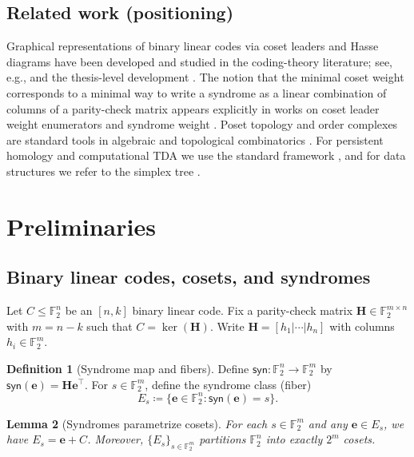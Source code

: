 \documentclass[11pt,twoside,leqno]{article}
\theoremstyle{definition}
\newtheorem{definition}{Definition}[section]
\theoremstyle{plain}
\newtheorem{lemma}[definition]{Lemma}
\theoremstyle{remark}
\newcommand{\Ftwo}{\mathbb{F}_2}
\newcommand{\syn}{\mathsf{syn}}
\newcommand{\HH}{\mathbf{H}}
\newcommand{\ee}{\mathbf{e}}
\begin{document}
\subsection{Related work (positioning)}\label{sec:related}
Graphical representations of binary linear codes via coset leaders and Hasse diagrams have been developed and studied in the coding-theory
literature; see, e.g., \cite{DelgadoCastilloHolguin2022} and the thesis-level development \cite{DelgadoThesis2021}. The notion that the minimal
coset weight corresponds to a minimal way to write a syndrome as a linear combination of columns of a parity-check matrix appears explicitly in
works on coset leader weight enumerators and syndrome weight \cite{Blokhuis2022,PellikaanSlides}. Poset topology and order complexes are standard
tools in algebraic and topological combinatorics \cite{BjornerTopMeth,WachsPosetTopology}. For persistent homology and computational TDA we use the
standard framework \cite{EdelsbrunnerHarer2010,ZomorodianCarlsson2005}, and for data structures we refer to the simplex tree \cite{BoissonnatMaria2014}.

\section{Preliminaries}\label{sec:prelims}

\subsection{Binary linear codes, cosets, and syndromes}
Let $C\le \Ftwo^n$ be an $[n,k]$ binary linear code. Fix a parity-check matrix
$\HH\in \Ftwo^{m\times n}$ with $m=n-k$ such that $C=\ker(\HH)$.
Write $\HH=[h_1|\cdots|h_n]$ with columns $h_i\in\Ftwo^m$.

\begin{definition}[Syndrome map and fibers]\label{def:syndrome}
Define $\syn:\Ftwo^n\to \Ftwo^m$ by $\syn(\ee)=\HH \ee^\top$.
For $s\in \Ftwo^m$, define the syndrome class (fiber)
\[
E_s\coloneqq\{\ee\in \Ftwo^n:\syn(\ee)=s\}.
\]
\end{definition}

\begin{lemma}[Syndromes parametrize cosets]\label{lem:cosets}
For each $s\in\Ftwo^m$ and any $\ee\in E_s$, we have $E_s=\ee+C$.
Moreover, $\{E_s\}_{s\in\Ftwo^m}$ partitions $\Ftwo^n$ into exactly $2^m$ cosets.
\end{lemma}
\end{document}
